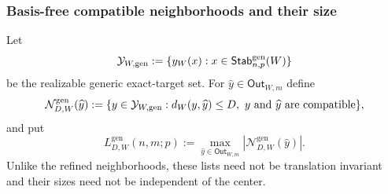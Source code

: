 \documentclass[11pt]{article}
\newcommand{\1}{\mathbf 1}
\theoremstyle{plain}
\theoremstyle{definition}
\theoremstyle{remark}
\begin{document}
\subsubsection{Basis-free compatible neighborhoods and their size}
\label{subsubsec:generic-original-compatible-neighborhoods}

Let
\begin{equation}
 \mathcal Y_{W,\rm gen}:=
 \{y_W(x):x\in\mathsf{Stab}_{n,p}^{\mathrm{gen}}(W)\}
 \label{eq:generic-original-target-set}
\end{equation}
be the realizable generic exact-target set.  For
$\widehat y\in\mathsf{Out}_{W,m}$ define
\begin{equation}
 \mathcal N_{D,W}^{\mathrm{gen}}(\widehat y)
 :=\{y\in\mathcal Y_{W,\rm gen}:
 d_W(y,\widehat y)\le D,
 \ y\text{ and }\widehat y\text{ are compatible}\},
 \label{eq:generic-original-compatible-list}
\end{equation}
and put
\begin{equation}
 L_{D,W}^{\mathrm{gen}}(n,m;p)
 :=\max_{\widehat y\in\mathsf{Out}_{W,m}}
 |\mathcal N_{D,W}^{\mathrm{gen}}(\widehat y)|.
 \label{eq:generic-original-list-size}
\end{equation}
Unlike the refined neighborhoods, these lists need not be translation
invariant and their sizes need not be independent of the center.
\end{document}
